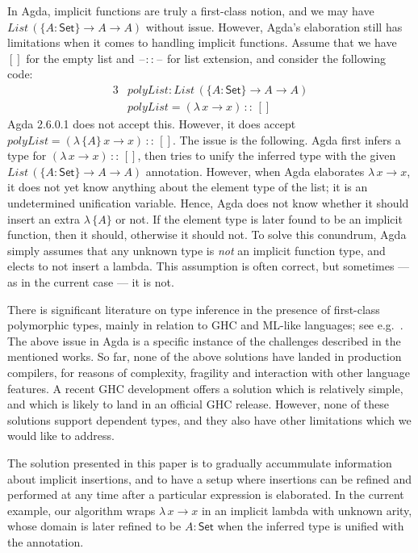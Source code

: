\documentclass[acmsmall,review,anonymous,prologue,dvipsnames]{acmart}\settopmatter{printfolios=true,printccs=false,printacmref=false}
\newcommand{\blank}{\mathord{\hspace{1pt}\text{--}\hspace{1pt}}}
\newcommand{\kw}[1]{{\mathsf{#1}}}
\theoremstyle{remark}
\begin{document}
In Agda, implicit functions are truly a first-class notion, and we may have
$List\,(\{A : \kw{Set}\}\to A \to A)$ without issue. However, Agda's elaboration
still has limitations when it comes to handling implicit functions. Assume that
we have $[]$ for the empty list and $\blank::\blank$ for list extension,
and consider the following code:
\begin{alignat*}{3}
  & polyList : List\,(\{A : \kw{Set}\}\to A \to A)\\
  & polyList = (\lambda\,x \to x)\,::\,[]
\end{alignat*}
Agda 2.6.0.1 does not accept this. However, it does accept $polyList =
(\lambda\,\{A\}\,x \to x)\,::\,[]$. The issue is the following. Agda first
infers a type for $(\lambda\,x \to x)\,::\,[]$, then tries to unify the
inferred type with the given $List\,(\{A : \kw{Set}\}\to A \to A)$
annotation. However, when Agda elaborates $\lambda\,x \to x$, it does not yet
know anything about the element type of the list; it is an undetermined
unification variable. Hence, Agda does not know whether it should insert an
extra $\lambda\,\{A\}$ or not. If the element type is later found to be an
implicit function, then it should, otherwise it should not. To solve this
conundrum, Agda simply assumes that any unknown type is \emph{not} an implicit
function type, and elects to not insert a lambda. This assumption is often
correct, but sometimes --- as in the current case --- it is not.

There is significant literature on type inference in the presence of first-class
polymorphic types, mainly in relation to GHC and ML-like languages; see
e.g.\ \cite{leijen2008hmf,leijen2009flexible,serrano2018guarded,vytiniotis2006boxy}.
The above issue in Agda is a specific instance of the challenges described in
the mentioned works. So far, none of the above solutions have landed in
production compilers, for reasons of complexity, fragility and interaction with
other language features. A recent GHC development \cite{serrano2020a} offers a
solution which is relatively simple, and which is likely to land in an official
GHC release. However, none of these solutions support dependent types, and they
also have other limitations which we would like to address.

The solution presented in this paper is to gradually accummulate information
about implicit insertions, and to have a setup where insertions can be refined
and performed at any time after a particular expression is elaborated. In the
current example, our algorithm wraps $\lambda\,x\to x$ in an implicit lambda
with unknown arity, whose domain is later refined to be $A : \kw{Set}$ when the
inferred type is unified with the annotation.
\end{document}
